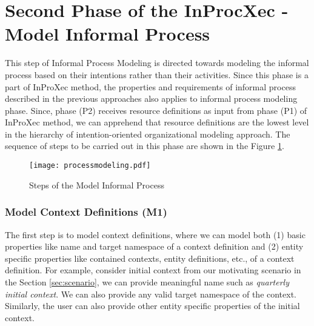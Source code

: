 \section{Second Phase of the InProcXec - Model Informal Process}
\label{sec:informalprocessmodeling}
This step of Informal Process Modeling is directed towards modeling the informal process based on their intentions rather than their activities. Since this phase is a part of InProXec method, the properties and requirements of informal process described in the previous approaches \cite{Sungur2014a,Sungur2015} also applies to informal process modeling phase. Since, phase (P2) receives resource definitions as input from phase (P1) of InProXec method, we can apprehend that resource definitions are the lowest level in the hierarchy of intention-oriented organizational modeling approach. The sequence of steps to be carried out in this phase are shown in the Figure \ref{fig:processdiagram}. 

\begin{figure}
	\centering
	\texttt{[image: processmodeling.pdf]}
	\caption{Steps of the Model Informal Process}
	\label{fig:processdiagram}
\end{figure}

\subsubsection{Model Context Definitions (M1)}  
The first step is to model context definitions, where we can model both (1) basic properties like name and target namespace of a context definition and (2) entity specific properties like contained contexts, entity definitions, etc., of a context definition. For example, consider initial context from our motivating scenario in the Section \ref{sec:scenario}, we can provide meaningful name such as \textit{quarterly initial context}. We can also provide any valid target namespace of the context. Similarly, the user can also provide other entity specific properties of the initial context. 

